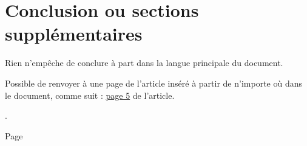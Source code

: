 
\section{Conclusion ou sections supplémentaires}

Rien n'empêche de conclure à part dans la langue principale du document. 

Possible de renvoyer à une page de l'article inséré à partir de n'importe où dans le document, comme suit :
\hyperlink{article1.5}{page 5} de l'article.

.

Page \pageref{subsec:BBB}